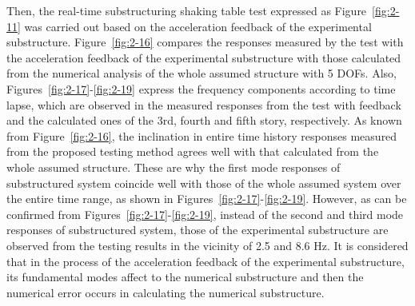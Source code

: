  Then, the real-time substructuring shaking table test expressed as Figure~\ref{fig:2-11} was carried out based on the acceleration feedback of the experimental substructure. Figure~\ref{fig:2-16} compares the responses measured by the test with the acceleration feedback of the experimental substructure with those calculated from the numerical analysis of the whole assumed structure with 5 DOFs. Also, Figures~\ref{fig:2-17}-\ref{fig:2-19} express the frequency components according to time lapse, which are observed in the measured responses from the test with feedback and the calculated ones of the 3rd, fourth and fifth story, respectively. As known from Figure~\ref{fig:2-16}, the inclination in entire time history responses measured from the proposed testing method agrees well with that calculated from the whole assumed structure. These are why the first mode responses of substructured system coincide well with those of the whole assumed system over the entire time range, as shown in Figures~\ref{fig:2-17}-\ref{fig:2-19}. However, as can be confirmed from Figures~\ref{fig:2-17}-\ref{fig:2-19}, instead of the second and third mode responses of substructured system, those of the experimental substructure are observed from the testing results in the vicinity of 2.5 and 8.6 Hz. It is considered that in the process of the acceleration feedback of the experimental substructure, its fundamental modes affect to the numerical substructure and then the numerical error occurs in calculating the numerical substructure.

